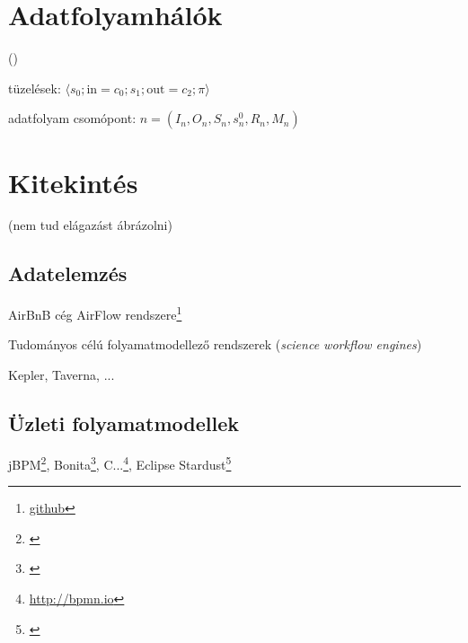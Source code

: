 \section{Adatfolyamhálók}

 


 ()

\newcommand{\prioritas}{\pi}
\newcommand{\tuple}[1]{\langle #1 \rangle}

tüzelések: $\tuple{s_0; \mathrm{in} = c_0; s_1; \mathrm{out} = c_2; \prioritas}$

adatfolyam csomópont: $n = (I_n, O_n, S_n, s_n^0, R_n, M_n)$

\section{Kitekintés\kieg}


 (nem tud elágazást ábrázolni)

\subsection{Adatelemzés}

AirBnB cég AirFlow rendszere\footnote{\url{github}}

Tudományos célú folyamatmodellező rendszerek (\emph{science workflow engines})

Kepler, Taverna, ...

\subsection{Üzleti folyamatmodellek}

jBPM\footnote{\url{}}, Bonita\footnote{\url{}}, C...\footnote{\url{http://bpmn.io}}, Eclipse Stardust\footnote{\url{}}

